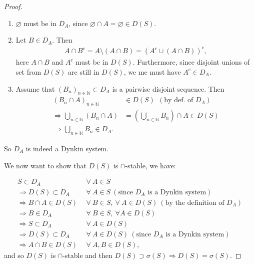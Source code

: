 \begin{proof}
    \begin{enumerate}
        \item \(\varnothing\) must be in \(D_A\), since \(\varnothing \cap A = \varnothing \in D(S)\).
        \item Let \(B\in D_A\). Then
        \begin{align*}
            A \cap B^c = A \setminus \left(A \cap B\right) = \left( A^c \cup \left(A \cap B\right) \right)^c,
        \end{align*}
        here \(A \cap B\) and \(A^c\) must be in \(D(S)\). Furthermore, since disjoint unions of set from \(D(S)\) are still in \(D(S)\), we
        me must have \(A^c \in D_A\).
        \item Assume that \(\left(B_n\right)_{n\in\mathbb{N}} \subset D_A\) is a pairwise disjoint sequence. Then
        \begin{align*}
            \left(B_n \cap A\right)_{n\in\mathbb{N}} & \in D(S) \ \ (\text{by def. of }D_A) \\
            \Rightarrow \bigcup\limits_{n\in\mathbb{N}} \left(B_n\cap A\right)& = \left(\bigcup\limits_{n\in\mathbb{N}} B_n\right) \cap A
            \in D(S) \\
            \Rightarrow \bigcup\limits_{n\in\mathbb{N}}B_n \in D_A.&
        \end{align*}
    \end{enumerate}
    So \(D_A\) is indeed a Dynkin system. 

    We now want to show that \(D(S)\) is \(\cap\)-stable, we have:

    \begin{align*}
        S\subset D_A \ & \ \forall \ A\in S \\
        \Rightarrow D(S) \subset D_A \ & \ \forall \ A\in S \ (\text{since }D_A\text{ is a Dynkin system})  \\
        \Rightarrow B \cap A \in D(S) \ & \ \forall \ B\in S, \ \forall \ A\in D(S) \ (\text{by the definition of }D_A) \\
        \Rightarrow B\in D_A \ & \ \forall \ B\in S, \ \forall A\in D(S) \\
        \Rightarrow S \subset D_A \ & \ \forall \ A \in D(S) \\
        \Rightarrow D(S) \subset D_A \ & \ \forall \ A\in D(S) \ (\text{since }D_A\text{ is a Dynkin system}) \\
        \Rightarrow A\cap B \in D(S) \ & \ \forall \ A, B\in D(S),
    \end{align*}
    and so \(D(S)\) is \(\cap\)-stable and then \(D(S) \supset \sigma(S) \Rightarrow D(S) = \sigma(S)\).
\end{proof}

